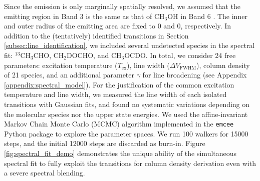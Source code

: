 \documentclass[linenumbers, twocolumn, twocolappendix, astrosymb, times]{aastex631}
\newcommand{\methanol}{CH$_3$OH\xspace}
\begin{document}
Since the emission is only marginally spatially resolved, we assumed that the emitting region in Band 3 is the same as that of \methanol in Band 6 \citep{Tobin2023}. The inner and outer radius of the emitting area are fixed to 0 and 0, respectively. 
In addition to the (tentatively) identified transitions in Section \ref{subsec:line_identification}, we included several undetected species in the spectral fit: $^{13}$CH$_3$CHO, CH$_2$DOCHO, and CH$_3$OCDO. In total, we consider 24 free parameters: excitation temperature ($T_\mathrm{ex}$), line width ($\Delta V_\mathrm{FWHM}$), column density of 21 species, and an additional parameter $\gamma$ for line broadening (see Appendix \ref{appendix:spectral_model}). \textrm{For the justification of the common excitation temperature and line width, we measured the line width of each isolated transitions with Gaussian fits, and found no systematic variations depending on the molecular species nor the upper state energies.}
We used the affine-invariant Markov Chain Monte Carlo (MCMC) algorithm implemented in the \texttt{emcee} Python package \citep{emcee} to explore the parameter spaces. We run 100 walkers for 15000 steps, and the initial 12000 steps are discarded as burn-in. Figure \ref{fig:spectral_fit_demo} demonstrates the unique ability of the simultaneous spectral fit to fully exploit the transitions for column density derivation even with a severe spectral blending. 
\end{document}
